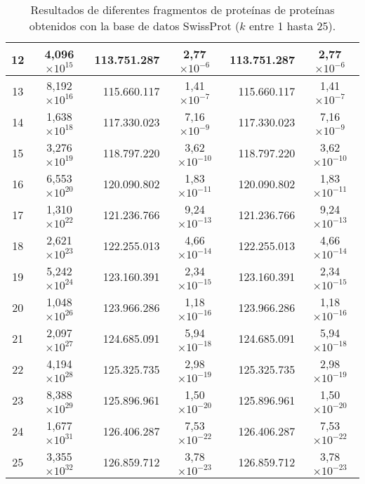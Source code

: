 \begin{table}[!hbt]
\begin{tabular}{| c  r  r  c  r  c |}
    12 & \multicolumn{1}{c}{4,096$\times 10^{15}$} & 113.751.287 & 2,77$\times 10^{-6}$ & 113.751.287 & 2,77$\times 10^{-6}$ \\ \hline  
    13 & \multicolumn{1}{c}{8,192$\times 10^{16}$} & 115.660.117 & 1,41$\times 10^{-7}$ & 115.660.117 & 1,41$\times 10^{-7}$ \\ \hline
    14 & \multicolumn{1}{c}{1,638$\times 10^{18}$} & 117.330.023 & 7,16$\times 10^{-9}$ & 117.330.023 & 7,16$\times 10^{-9}$ \\ \hline  
    15 & \multicolumn{1}{c}{3,276$\times 10^{19}$} & 118.797.220 & 3,62$\times 10^{-10}$ & 118.797.220 & 3,62$\times 10^{-10}$ \\ \hline
    16 & \multicolumn{1}{c}{6,553$\times 10^{20}$} & 120.090.802 & 1,83$\times 10^{-11}$ & 120.090.802 & 1,83$\times 10^{-11}$ \\ \hline  
    17 & \multicolumn{1}{c}{1,310$\times 10^{22}$} & 121.236.766 & 9,24$\times 10^{-13}$ & 121.236.766 & 9,24$\times 10^{-13}$ \\ \hline
    18 & \multicolumn{1}{c}{2,621$\times 10^{23}$} & 122.255.013 & 4,66$\times 10^{-14}$ & 122.255.013 & 4,66$\times 10^{-14}$ \\ \hline  
    19 & \multicolumn{1}{c}{5,242$\times 10^{24}$} & 123.160.391 & 2,34$\times 10^{-15}$ & 123.160.391 & 2,34$\times 10^{-15}$ \\ \hline
    20 & \multicolumn{1}{c}{1,048$\times 10^{26}$} & 123.966.286 & 1,18$\times 10^{-16}$ & 123.966.286 & 1,18$\times 10^{-16}$ \\ \hline  
    21 & \multicolumn{1}{c}{2,097$\times 10^{27}$} & 124.685.091 & 5,94$\times 10^{-18}$ & 124.685.091 & 5,94$\times 10^{-18}$ \\ \hline
    22 & \multicolumn{1}{c}{4,194$\times 10^{28}$} & 125.325.735 & 2,98$\times 10^{-19}$ & 125.325.735 & 2,98$\times 10^{-19}$ \\ \hline  
    23 & \multicolumn{1}{c}{8,388$\times 10^{29}$} & 125.896.961 & 1,50$\times 10^{-20}$ & 125.896.961 & 1,50$\times 10^{-20}$ \\ \hline
    24 & \multicolumn{1}{c}{1,677$\times 10^{31}$} & 126.406.287 & 7,53$\times 10^{-22}$ & 126.406.287 & 7,53$\times 10^{-22}$ \\ \hline  
    25 & \multicolumn{1}{c}{3,355$\times 10^{32}$} & 126.859.712 & 3,78$\times 10^{-23}$ & 126.859.712 & 3,78$\times 10^{-23}$ \\ \hline        
    \end{tabular}
    \caption{Resultados de diferentes fragmentos de proteínas de proteínas obtenidos con la base de datos SwissProt ($k$ entre 1 hasta 25).}
    \label{tb:labela11}
\end{table}

